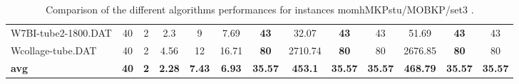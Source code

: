 \begin{table}[h]
{\begin{tabular}{lcccccccccccc}
W7BI-tube2-1800.DAT & 40 & 2 &  \textcolor{blue2}{2.3} & 9 & 7.69 &  \textbf{43} & 32.07 &  \textbf{43} & 43 & 51.69 &  \textbf{43} & 43 \\
Wcollage-tube.DAT & 40 & 2 &  \textcolor{blue2}{4.56} & 12 & 16.71 &  \textbf{80} & 2710.74 &  \textbf{80} & 80 & 2676.85 &  \textbf{80} & 80 \\
\cline{1-13} \textbf{avg} & \textbf{40} & \textbf{2} & \textbf{2.28} & \textbf{7.43} & \textbf{6.93} & \textbf{35.57} & \textbf{453.1} & \textbf{35.57} & \textbf{35.57} & \textbf{468.79} & \textbf{35.57} & \textbf{35.57} \\ \cline{1-13}
\bottomrule
\end{tabular}
}%
\caption{Comparison of the different algorithms performances for instances momhMKPstu/MOBKP/set3 .}
\label{tab:table_compare_momhMKPstu/MOBKP/set3 }
\end{table}
